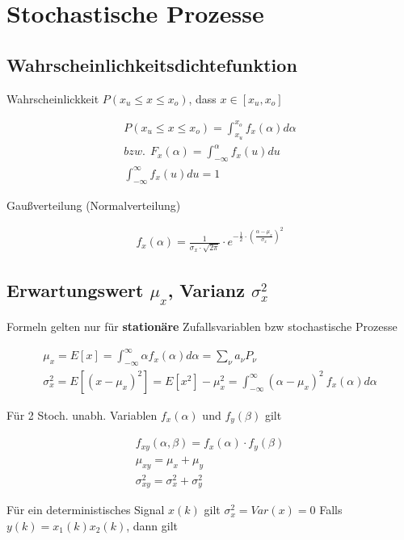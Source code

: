 \documentclass[10pt,a4paper]{article}
\begin{document}
\section{Stochastische Prozesse}
\subsection{Wahrscheinlichkeitsdichtefunktion}
Wahrscheinlickkeit $P(x_u \leq x \leq x_o )$, dass $x \in [x_u,x_o]$ 
  \begin{mdframed}[style=exercise]
    \begin{align}
        P(x_u \leq x \leq x_o ) = \displaystyle\int_{x_u}^{x_o} f_x(\alpha) d\alpha \\
        bzw. \ \ F_x(\alpha) = \displaystyle\int_{-\infty}^{\alpha} f_x(u)du\\
        \displaystyle\int_{-\infty}^{\infty} f_x(u)du = 1
    \end{align}
  \end{mdframed}
Gaußverteilung (Normalverteilung)
  \begin{mdframed}[style=exercise]
    \begin{align}
        f_x(\alpha) = \frac{1}{\sigma_x \cdot \sqrt{2\pi}} \cdot e^{-\frac{1}{2} \cdot \left( \frac{\alpha - \mu_x}{\sigma_x}\right)^2}
    \end{align}
  \end{mdframed}
\subsection{Erwartungswert $\mu_x$, Varianz $\sigma_x^2$}
Formeln gelten nur für \textbf{stationäre} Zufallsvariablen bzw stochastische Prozesse
  \begin{mdframed}[style=exercise]
    \begin{align}
        \mu_x = E[x] = \displaystyle\int_{-\infty}^{\infty} \alpha f_x(\alpha) d\alpha = \displaystyle\sum_{\nu}^{} a_\nu P_\nu\\
        \sigma_x^2 = E[(x-\mu_x)^2] = E[x^2]-\mu_x^2  = \displaystyle\int_{-\infty}^{\infty} (\alpha-\mu_x)^2 \ f_x(\alpha) d\alpha
    \end{align}
  \end{mdframed}
Für 2 Stoch. unabh. Variablen $f_x(\alpha)$ und $f_y(\beta)$ gilt
  \begin{mdframed}[style=exercise]
    \begin{align}
        f_{xy}(\alpha,\beta) = f_x(\alpha)\cdot f_y(\beta)\\
        \mu_{xy} = \mu_{x} + \mu_{y}\\
        \sigma_{xy}^2 = \sigma_{x}^2 + \sigma_{y}^2
    \end{align}
  \end{mdframed}
Für ein deterministisches Signal $x(k)$ gilt $\sigma_x^2=Var(x)=0$
Falls $y(k) = x_1(k)x_2(k)$, dann gilt
\end{document}
